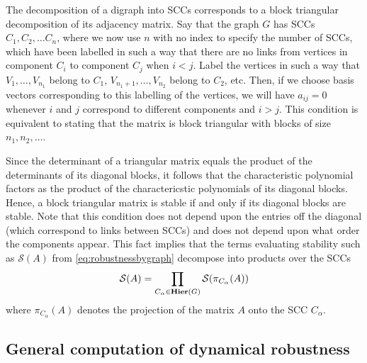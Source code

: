 The decomposition of a digraph into SCCs corresponds to a block triangular decomposition of its adjacency matrix.  Say that the graph $G$ has SCCs $C_1, C_2, \ldots C_n$, where we now use $n$ with no index to specify the number of SCCs, which have been labelled in such a way that there are no links from vertices in component $C_i$ to component $C_j$ when $i < j$.  Label the vertices in such a way that $V_1, \ldots, V_{n_1}$ belong to $C_1$, $V_{n_1 + 1}, \ldots, V_{n_2}$ belong to $C_2$, etc.  Then, if we choose basis vectors corresponding to this labelling of the vertices, we will have $a_{ij} = 0$ whenever $i$ and $j$ correspond to different components and $i > j$.  This condition is equivalent to stating that the matrix is block triangular with blocks of size $n_1, n_2, \ldots$.

Since the determinant of a triangular matrix equals the product of the determinants of its diagonal blocks, it follows that the characteristic polynomial factors as the product of the charactericstic polynomials of its diagonal blocks.  Hence, a block triangular matrix is stable if and only if its diagonal blocks are stable.  Note that this condition does not depend upon the entries off the diagonal (which correspond to links between SCCs) and does not depend upon what order the components appear. This fact implies that the terms evaluating stability such as $\mathcal{S}(A)$ from \ref{eq:robustnessbygraph} decompose into products over the SCCs
\begin{equation}\label{eq:stabfactor}
\mathcal{S}(A) = \prod_{C_\alpha \in \mathbf{Hier}(G)} \mathcal{S}(\pi_{C_{\alpha}}(A))
\end{equation}
where $\pi_{C_{\alpha}}(A)$ denotes the projection of the matrix $A$ onto the SCC $C_{\alpha}$.

\subsection{General computation of dynamical robustness}

